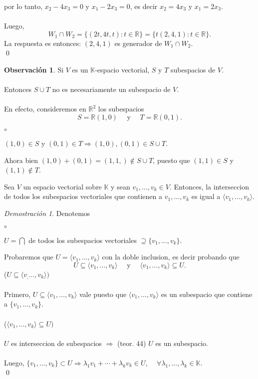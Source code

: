 \documentclass{article}
\theoremstyle{definition}
\theoremstyle{definition}
\newtheorem*{obs}{Observación}
\theoremstyle{remark}
\newtheorem*{demo}{Demostración}
\begin{document}
por lo tanto, $x_2-4x_3=0$ y $x_1-2x_3=0$, es decir $x_2=4x_3$ y $x_1=2x_3$.
\\\\
Luego, \[
  W_1 \cap W_2 = \{(2t,4t,t) : t \in \mathbb{R} \} = \{t(2,4,1) : t \in \mathbb{R}\}. \]
La respuesta es entonces: $(2,4,1)$ es generador de $W_1 \cap W_2$. \\ \qed \pagebreak

\begin{obs}
  Si $V$ es un $\mathbb{K}$-espacio vectorial, $S$ y $T$ subespacios de $V$. \\\\ Entonces $S \cup T$ no es necesariamente un subespacio de $V$. \\\\ En efecto, consideremos en $\mathbb{R}^2$ los subespacios \[
    S=\mathbb{R}(1,0) \quad \text{ y } \quad T=\mathbb{R}(0,1).
  \]
\begin{list}{$\circ$}{}  
\item $(1,0) \in S$ y $(0,1) \in T \Rightarrow  (1,0),(0,1) \in S \cup T$.
\item Ahora bien $(1,0) + (0,1)=(1,1,) \notin S \cup T$, puesto que $(1,1) \in S$ y $(1,1) \notin T$.
\end{list}
\end{obs}
\begin{teo}
  Sea $V$ un espacio vectorial sobre $\mathbb{K}$ y sean $v_1, \dots ,v_k \in V$. Entonces, la interseccion de todos los subespacios vectoriales que contienen a $v_1, \dots, v_k$ es igual a $\langle v_1, \dots ,v_k \rangle$.
\end{teo}
\begin{demo}
  Denotemos \begin{list}{$\circ$}{}  
  \item $U=\bigcap$ de todos los subespacios vectoriales $\supseteq \{v_1, \dots ,v_k\}$.
\end{list}
Probaremos que $U=\langle v_1, \dots,v_k \rangle $ con la doble inclusion, es decir probando que \[
  U \subseteq \langle v_1, \dots, v_k \rangle \quad \text{ y } \quad \langle v_1, \dots ,v_k \rangle \subseteq U.
\]
($U \subseteq \langle v_, \dots ,v_k \rangle)$ \\\\ 
Primero, $U \subseteq \langle v_1, \dots ,v_k \rangle $ vale puesto que $\langle v_1, \dots ,v_k \rangle $ es un subespacio que contiene a $\{v_1, \dots ,v_k\}$. \\\\ 
($\langle v_1, \dots ,v_k \rangle \subseteq U)$ \\\\
$U$ es interseccion de subespacios $\Rightarrow$ (teor. 44) $U$ es un subespacio. \\\\ Luego, $\{v_1, \dots ,v_k\} \subset U \Rightarrow \lambda_1 v_1 + \cdots + \lambda_k v_k \in U$, $\quad \forall \lambda_1, \dots ,\lambda_k \in \mathbb{K}$. \\ \qed
\end{demo} \pagebreak
\end{document}
